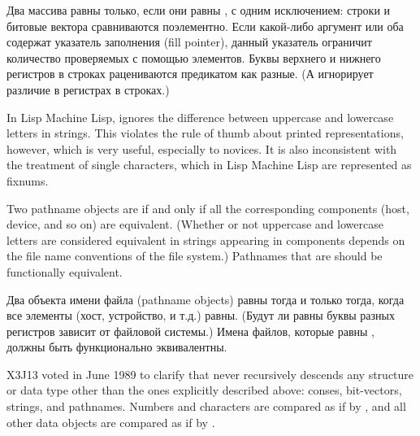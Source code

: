 \begin{defun}[Function]
Два массива равны  только, если они равны , с одним
исключением:
строки и битовые вектора сравниваются поэлементно.
Если какой-либо аргумент или оба содержат указатель заполнения (fill pointer),
данный указатель ограничит количество проверяемых с помощью 
элементов.
Буквы верхнего и нижнего регистров в строках рацениваются предикатом 
как разные. (А  игнорирует различие в регистрах в строках.) 

\beforenoterule
\begin{incompatibility}
In Lisp Machine Lisp,  ignores the difference between
uppercase and lowercase letters in strings.
This violates the rule of thumb about
printed representations, however, which is very useful, especially
to novices.  It is also inconsistent with the treatment of single characters,
which in Lisp Machine Lisp are represented as fixnums.
\end{incompatibility}
\afternoterule

Two pathname objects are  if and only if
all the corresponding components
(host, device, and so on) are equivalent.  (Whether or not
uppercase and lowercase letters are considered equivalent
in strings appearing in components depends on the file
name conventions of the file system.)  Pathnames
that are  should be functionally equivalent.

Два объекта имени файла (pathname objects) равны  тогда и только
тогда, когда все элементы (хост, устройство, и т.д.) равны. (Будут ли равны
буквы разных регистров зависит от файловой системы.) Имена файлов, которые равны
, должны быть функционально эквивалентны.

\begin{new}
X3J13 voted in June 1989
to clarify that  never recursively
descends any structure or data type other than the ones explicitly
described above: conses, bit-vectors, strings, and pathnames.
Numbers and characters are compared as if by , and all other
data objects are compared as if by .
\end{new}


\end{defun}

